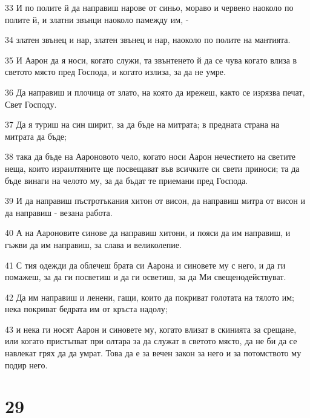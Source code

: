 \par 33 И по полите й да направиш нарове от синьо, мораво и червено наоколо по полите й, и златни звънци наоколо памежду им, -
\par 34 златен звънец и нар, златен звънец и нар, наоколо по полите на мантията.
\par 35 И Аарон да я носи, когато служи, та звънтенето й да се чува когато влиза в светото място пред Господа, и когато излиза, за да не умре.
\par 36 Да направиш и плочица от злато, на която да ирежеш, както се изрязва печат, Свет Господу.
\par 37 Да я туриш на син ширит, за да бъде на митрата; в предната страна на митрата да бъде;
\par 38 така да бъде на Аароновото чело, когато носи Аарон нечестието на светите неща, които израилтяните ще посвещават във всичките си свети приноси; та да бъде винаги на челото му, за да бъдат те приемани пред Господа.
\par 39 И да направиш пъстротъкания хитон от висон, да направиш митра от висон и да направиш - везана работа.
\par 40 А на Аароновите синове да направиш хитони, и пояси да им направиш, и гъжви да им направиш, за слава и великолепие.
\par 41 С тия одежди да облечеш брата си Аарона и синовете му с него, и да ги помажеш, за да ги посветиш и да ги осветиш, за да Ми свещенодействуват.
\par 42 Да им направиш и ленени, гащи, които да покриват голотата на тялото им; нека покриват бедрата им от кръста надолу;
\par 43 и нека ги носят Аарон и синовете му, когато влизат в скинията за срещане, или когато пристъпват при олтара за да служат в светото място, да не би да се навлекат грях да да умрат. Това да е за вечен закон за него и за потомството му подир него.

\chapter{29}

